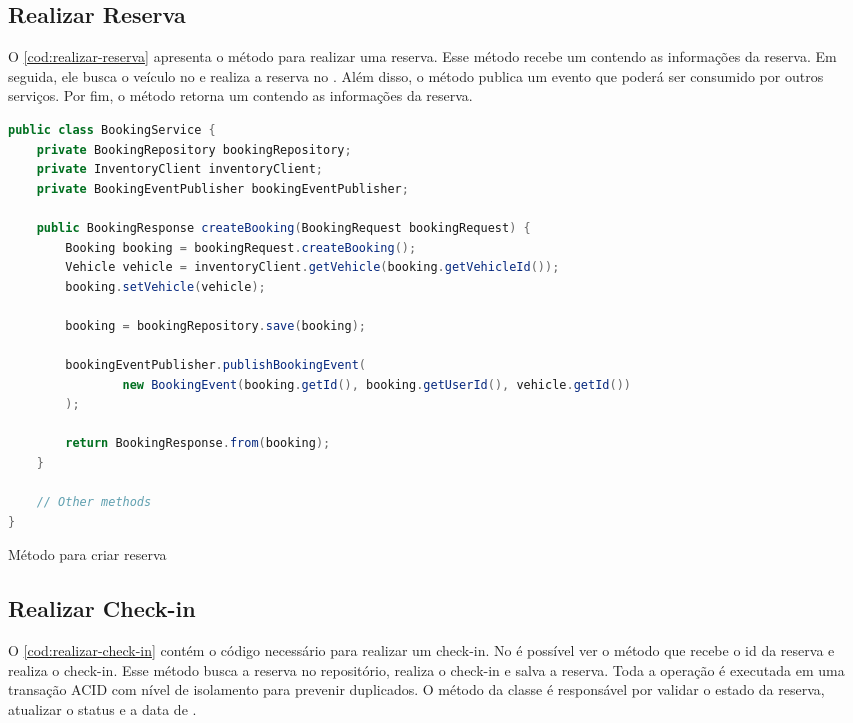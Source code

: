 \subsection{Realizar Reserva}
O \autoref{cod:realizar-reserva} apresenta o método para realizar uma reserva. Esse método recebe um  contendo as informações da reserva. Em seguida, ele busca o veículo no  e realiza a reserva no . Além disso, o método publica um evento que poderá ser consumido por outros serviços. Por fim, o método retorna um  contendo as informações da reserva.

\begin{codigo}[H]
    \begin{lstlisting}[language=Java]
public class BookingService {
    private BookingRepository bookingRepository;
    private InventoryClient inventoryClient;
    private BookingEventPublisher bookingEventPublisher;

    public BookingResponse createBooking(BookingRequest bookingRequest) {
        Booking booking = bookingRequest.createBooking();
        Vehicle vehicle = inventoryClient.getVehicle(booking.getVehicleId());
        booking.setVehicle(vehicle);

        booking = bookingRepository.save(booking);

        bookingEventPublisher.publishBookingEvent(
                new BookingEvent(booking.getId(), booking.getUserId(), vehicle.getId())
        );

        return BookingResponse.from(booking);
    }

    // Other methods
}
    \end{lstlisting}
    \caption{Método para criar reserva}
    \label{cod:realizar-reserva}
\end{codigo}

\subsection{Realizar Check-in}
O \autoref{cod:realizar-check-in} contém o código necessário para realizar um check-in. No  é possível ver o método  que recebe o id da reserva e realiza o check-in. Esse método busca a reserva no repositório, realiza o check-in e salva a reserva. Toda a operação é executada em uma transação ACID com nível de isolamento  para prevenir  duplicados. O método  da classe  é responsável por validar o estado da reserva, atualizar o status e a data de .

